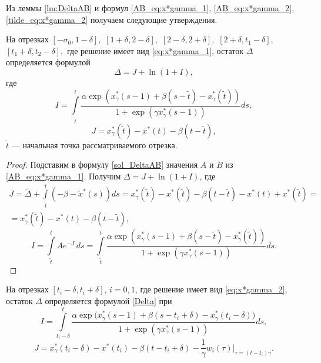 Из леммы \eqref{lm:DeltaAB} и формул \eqref{AB_eq:x*gamma_1}, \eqref{AB_eq:x*gamma_2}, \eqref{tilde_eq:x*gamma_2} получаем следующие утверждения.
\begin{corollary}\label{corol_Delta_long}
На отрезках $[-\sigma_0, 1 - \delta],$ $[1 + \delta, 2 - \delta],$ $[2 - \delta, 2 + \delta],$ $[2 + \delta, t_1 - \delta],$ $[t_1 + \delta,t_2 - \delta],$ где решение имеет вид \eqref{eq:x*gamma_1}, остаток $\Delta$ определяется формулой
\begin{equation}
    \label{Delta}
    \Delta = J + \ln(1 + I),
\end{equation}
где 
\begin{equation}
    \label{I_long}
    I = \int\limits_{\tilde{t}}^{t}\frac{\alpha\exp(x_{\gamma}^*(s-1)+\beta(s-\tilde{t})-x_{\gamma}^*(\tilde{t}))}{1 + \exp(\gamma x_{\gamma}^*(s-1))} ds,
\end{equation}
%
\begin{equation}\label{eq:J_long}
    J = x_{\gamma}^*(\tilde{t}) - x^*(t) - \beta(t - \tilde{t}),
\end{equation}
%
$\tilde{t}$ --- начальная точка рассматриваемого отрезка.
\end{corollary}
%
\begin{proof}
	Подставим в формулу \eqref{sol_DeltaAB} значения $A$ и $B$ из \eqref{AB_eq:x*gamma_1}. Получим $\Delta = J + \ln(1 + I)$, где
\begin{multline*}
	J = \tilde{\Delta} + \int\limits_{\tilde{t}}^{t}(-\beta - \dot{x}^*(s))ds = x_{\gamma}^*(\tilde{t}) - x^*(\tilde{t}) - \beta(t - \tilde{t}) - x^*(t) + x^*(\tilde{t}) =\\= x_{\gamma}^*(\tilde{t}) - x^*(t) - \beta(t - \tilde{t}),
\end{multline*}
\[
	I = \int\limits_{\tilde{t}}^{t} A e^{-J} \, ds = \int\limits_{\tilde{t}}^{t}\frac{\alpha\exp(x_{\gamma}^*(s-1)+\beta(s-\tilde{t})-x_{\gamma}^*(\tilde{t}))}{1 + \exp(\gamma x_{\gamma}^*(s-1))} ds.
\]
\end{proof}
%
\begin{corollary}\label{corol_Delta_short}
На отрезках $[t_i - \delta, t_i + \delta]$, $i=0, 1$, где решение имеет вид \eqref{eq:x*gamma_2}, остаток $\Delta$ определяется формулой \eqref{Delta} при
 \begin{equation}
    \label{I_point}
   I=\int\limits_{t_i-\delta}^{t}\frac{\alpha\exp\big(x_{\gamma}^*(s-1)+\beta(s-t_i+\delta)-x_{\gamma}^*(t_i-\delta)\big)}{1+\exp(\gamma x_{\gamma}^*(s-1))}ds,
\end{equation}
%
\begin{equation}
    \label{J_point}
    J=x_{\gamma}^*(t_i - \delta) - x^*(t_i) - \beta(t-t_i+\delta) - \frac{1}{\gamma} w_i(\tau)|_{\tau=(t-t_i)\gamma}.
\end{equation}
\end{corollary}
